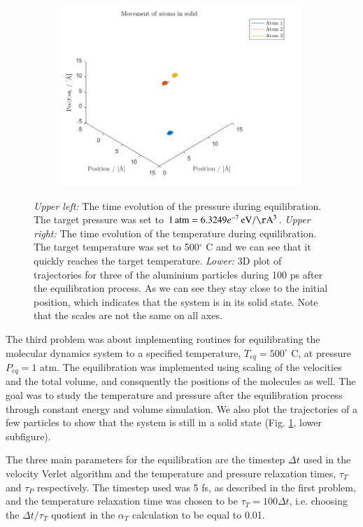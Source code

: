 \begin{figure}[H]
\begin{subfigure}[b]{0.40\textwidth}
        \includegraphics[width=\textwidth]{graphics/task3/traj.png}
    \end{subfigure}
    \caption{\textit{Upper left:} The time evolution of the pressure during equilibration. The target pressure was set to $\unit[1]{atm} = \unit[6.3249e^{-7}]{eV/\AA^3}$. \textit{Upper right:} The time evolution of the temperature during equilibration. The target temperature was set to 500$^\circ$ C and we can see that it quickly reaches the target temperature. \textit{Lower:} 3D plot of trajectories for three of the aluminium particles during 100 ps after the equilibration process. As we can see they stay close to the initial position, which indicates that the system is in its solid state. Note that the scales are not the same on all axes.}
    \label{fig:equilibrium500}
\end{figure}

The third problem was about implementing routines for equilibrating the molecular dynamics system to a specified temperature, $T_{eq} = 500^\circ$ C, at pressure $P_{eq} = 1$ atm. The equilibration was implemented using scaling of the velocities and the total volume, and consquently the positions of the molecules as well. The goal was to study the temperature and pressure after the equilibration process through constant energy and volume simulation. We also plot the trajectories of a few particles to show that the system is still in a solid state (Fig. \ref{fig:equilibrium500}, lower subfigure).

The three main parameters for the equilibration are the timestep $\Delta t$ used in the velocity Verlet algorithm and the temperature and pressure relaxation times, $\tau_T$ and $\tau_P$ respectively. The timestep used was 5 fs, as described in the first problem, and the temperature relaxation time was chosen to be $\tau_T = 100 \Delta t$, i.e. choosing the $\Delta t/\tau_T$ quotient in the $\alpha_T$ calculation to be equal to 0.01.

